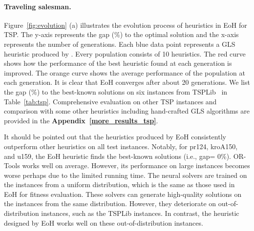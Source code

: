 \paragraph{Traveling salesman.}

Figure~\ref{fig:evolution} (a) illustrates the evolution process of heuristics in EoH for TSP. The y-axis represents the gap (\%) to the optimal solution and the x-axis represents the number of generations. Each blue data point represents a GLS heuristic produced by \ourmethod{}.   Every population consists of 10 heuristics. The red curve shows how the performance
of the best heuristic found at each generation is improved. 
The orange curve shows the average performance of the population at each generation. It is clear that EoH converges after about 20 generations.
We list the gap (\%) to the best-known solutions on six instances from TSPLib~\cite{reinelt1991tsplib} in Table~\ref{tab:tsp}. Comprehensive evaluation on other TSP instances and comparison with some other heuristics including hand-crafted GLS algorithms are provided in the \textbf{Appendix~\ref{more_results_tsp}}.


It should be pointed out that the heuristics produced by EoH consistently outperform other heuristics on all test instances. Notably, for pr124, kroA150, and u159, the EoH heuristic finds the best-known solutions (i.e., gap= 0\%). OR-Tools works well on average. However, its performance on large instances becomes worse perhaps due to the limited running time. The neural solvers are trained on the instances from a uniform distribution, which is the same as those used in EoH for fitness evaluation. These solvers can generate high-quality solutions on the instances from the same distribution. However, they deteriorate on out-of-distribution instances, such as the TSPLib instances. In contrast,  the heuristic designed by EoH works well on these out-of-distribution instances.


